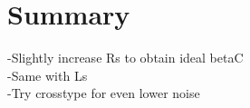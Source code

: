 \chapter{Summary}

-Slightly increase Rs to obtain ideal betaC \\
-Same with Ls \\
-Try crosstype for even lower noise